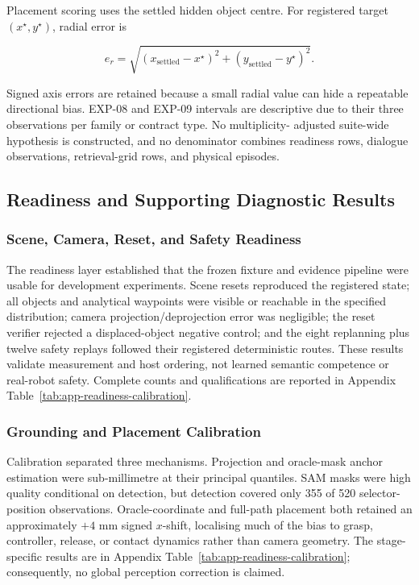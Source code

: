 \documentclass{article}
\begin{document}
Placement scoring uses the settled hidden object centre. For registered target
$(x^\star,y^\star)$, radial error is

\begin{equation}
    e_r = \sqrt{(x_{\mathrm{settled}}-x^\star)^2
                +(y_{\mathrm{settled}}-y^\star)^2}.
    \label{eq:placement-radial-error}
\end{equation}

Signed axis errors are retained because a small radial value can hide a
repeatable directional bias. EXP-08 and EXP-09 intervals are descriptive due
to their three observations per family or contract type. No multiplicity-
adjusted suite-wide hypothesis is constructed, and no denominator combines
readiness rows, dialogue observations, retrieval-grid rows, and physical
episodes.

\subsection{Readiness and Supporting Diagnostic Results}
\label{subsec:evaluation-supporting-results}

\subsubsection{Scene, Camera, Reset, and Safety Readiness}

The readiness layer established that the frozen fixture and evidence pipeline
were usable for development experiments. Scene resets reproduced the registered
state; all objects and analytical waypoints were visible or reachable in the
specified distribution; camera projection/deprojection error was negligible;
the reset verifier rejected a displaced-object negative control; and the eight
replanning plus twelve safety replays followed their registered deterministic
routes. These results validate measurement and host ordering, not learned
semantic competence or real-robot safety. Complete counts and qualifications
are reported in Appendix Table~\ref{tab:app-readiness-calibration}.

\subsubsection{Grounding and Placement Calibration}

Calibration separated three mechanisms. Projection and oracle-mask anchor
estimation were sub-millimetre at their principal quantiles. SAM masks were
high quality conditional on detection, but detection covered only 355 of 520
selector-position observations. Oracle-coordinate and full-path placement both
retained an approximately $+4$ mm signed $x$-shift, localising much of the
bias to grasp, controller, release, or contact dynamics rather than camera
geometry. The stage-specific results are in Appendix
Table~\ref{tab:app-readiness-calibration}; consequently, no global perception
correction is claimed.
\end{document}

